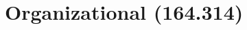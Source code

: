 \documentclass[../main.tex]{subfiles}
\begin{document}
\section{Organizational (164.314)}
\end{document}
